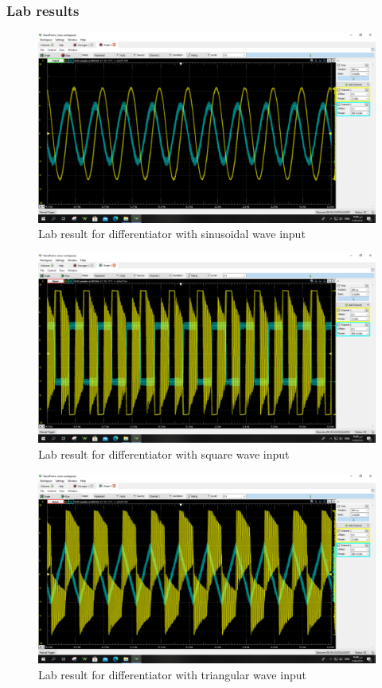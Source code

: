 \documentclass[a4paper, 12pt, english]{article}
\begin{document}
\subsubsection{Lab results}
\begin{figure}[H]
    \centering
    \includegraphics[width=\linewidth]{images/diff sine lab.png}
    \caption{Lab result for differentiator with sinusoidal wave input}
    \label{fig:Lab result for differentiator with sinusoidal wave input}
\end{figure}
\begin{figure}[H]
    \centering
    \includegraphics[width=\linewidth]{images/diff square lab.png}
    \caption{Lab result for differentiator with square wave input}
    \label{fig:Lab result for differentiator with square wave input}
\end{figure}
\begin{figure}[H]
    \centering
    \includegraphics[width=\linewidth]{images/diff tri lab.png}
    \caption{Lab result for differentiator with triangular wave input}
    \label{fig:Lab result for differentiator with triangular wave input}
\end{figure}
\end{document}
